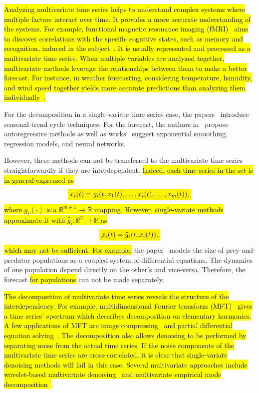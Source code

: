 \documentclass[referee, pdflatex, sn-mathphys-num]{sn-jnl}
\newcommand{\mathcolorbox}[2]{\colorbox{#1}{$\displaystyle #2$}}
\theoremstyle{definition}
\theoremstyle{plain}
\begin{document}
	\hl{Analyzing multivariate time series helps to understand complex systems where multiple factors interact over time. It provides a more accurate understanding of the systems.  For example, functional magnetic resonance imaging (fMRI)~{\cite{rinck2018magnetic}} aims to discover correlations with the specific cognitive states, such as memory and recognition, induced in the subject~{\cite{Logothetis2008WhatWC}}. It is usually represented and processed as a multivariate time series. When multiple variables are analyzed together, multivariate methods leverage the relationships between them to make a better forecast. For instance, in weather forecasting, considering temperature, humidity, and wind speed together yields more accurate predictions than analyzing them individually~{\cite{weather_forecast}}.} 
	
	For the decomposition in a single-variate time series case, the papers~\cite{enders2010applied, x11, cleveland90} introduce seasonal-trend-cycle techniques. For the forecast, the authors in~\cite{Box_Jenkins_methodology} propose autoregressive methods as well as works~\cite{3b1355aedd1041f1853e609a410576f3, enders2010applied} suggest exponential smoothing, regression models, and neural networks. 
	
	However, these methods can not be transferred to the multivariate time series straightforwardly if they are interdependent. \hl{Indeed, each time series in the set is in general expressed as} \begin{equation*}
		\mathcolorbox{yellow}{x_i(t) = g_i(t, x_1(t), \ldots, x_i(t), \ldots, x_m(t)),}
	\end{equation*}	\hl{where $g_i(\cdot)$ is a $\mathbb{R}^{m + 1} \to \mathbb{R}$ mapping. However, single-variate methods approximate it with $\hat{g}_i: \mathbb{R}^2 \to \mathbb{R}$ as}  \begin{equation*}
		\mathcolorbox{yellow}{x_i(t) = \hat{g}_i(t, x_i(t)),}
	\end{equation*}	\hl{which may not be sufficient. For example,} the paper~\cite{Volterra:1928} models the size of prey-and-predator populations as a coupled system of differential equations. The dynamics of one population depend directly on the other's and vice-versa. Therefore, the forecast \hl{for populations} can not be made separately. 
	
	\hl{The decomposition of multivariate time series reveals the structure of the interdependency. For example, multidimensional Fourier transform (MFT)~{\cite{smith1995handbook}} gives a time series' spectrum which describes decomposition on elementary harmonics. A few applications of MFT are image compressing~{\cite{jpeg}} and partial differential equation solving~{\cite{haberman2013applied}}. The decomposition also allows denoising to be performed by separating noise from the actual time series. If the noise components of the multivariate time series are cross-correlated, it is clear that single-variate denoising methods will fail in this case. Several multivariate approaches include wavelet-based multivariate denoising~{\cite{wavelet_denoise}} and multivariate empirical mode decomposition~{\cite{HAO2017263}}}.
	
\end{document}
